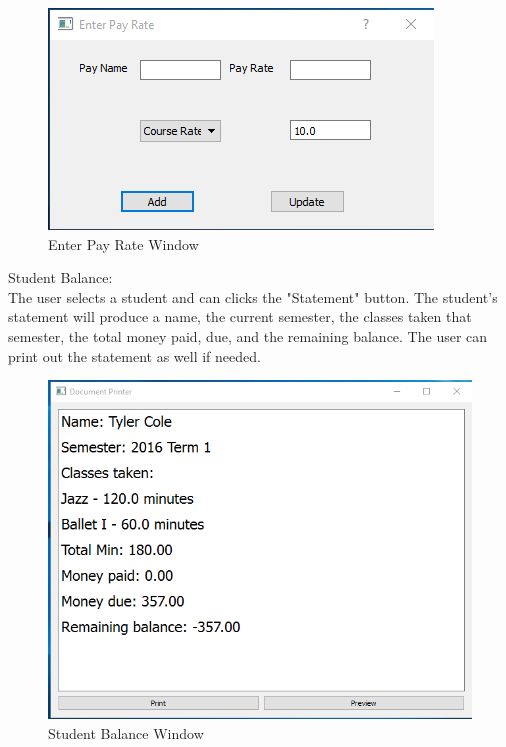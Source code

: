 \begin{figure}
  \includegraphics[width=\linewidth]{pics/userGuide/enterPay.png}
  \caption{Enter Pay Rate Window} 
  \label{fig:User doc: Enter Pay Rate}
\end{figure}

Student Balance:\\
The user selects a student and can clicks the "Statement" button. The student's statement will produce a name, the current semester, the classes taken that semester, the total money paid, due, and the remaining balance. The user can print out the statement as well if needed.\\

\begin{figure}
  \includegraphics[width=\linewidth]{pics/userGuide/stuBalence.png}
  \caption{Student Balance Window} 
  \label{fig:User doc: Student Balance}
\end{figure}

